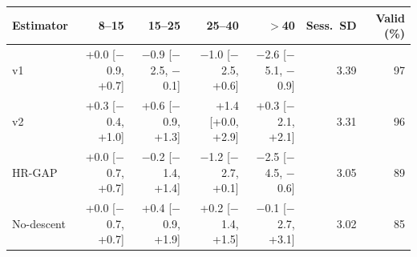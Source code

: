 \begin{tabular}{@{}lrrrrrr@{}}
\toprule
Estimator & 8--15 & 15--25 & 25--40 & $>$40 & Sess.\ SD & Valid (\%) \\
\midrule
\ascent{} v1 & +0.0 [$-$0.9, +0.7] & $-$0.9 [$-$2.5, $-$0.1] & $-$1.0 [$-$2.5, +0.6] & $-$2.6 [$-$5.1, $-$0.9] & 3.39 & 97 \\
\ascent{} v2 & +0.3 [$-$0.4, +1.0] & +0.6 [$-$0.9, +1.3] & +1.4 [+0.0, +2.9] & +0.3 [$-$2.1, +2.1] & 3.31 & 96 \\
HR-GAP & +0.0 [$-$0.7, +0.7] & $-$0.2 [$-$1.4, +1.4] & $-$1.2 [$-$2.7, +0.1] & $-$2.5 [$-$4.5, $-$0.6] & 3.05 & 89 \\
No-descent & +0.0 [$-$0.7, +0.7] & +0.4 [$-$0.9, +1.9] & +0.2 [$-$1.4, +1.5] & $-$0.1 [$-$2.7, +3.1] & 3.02 & 85 \\
\bottomrule
\end{tabular}